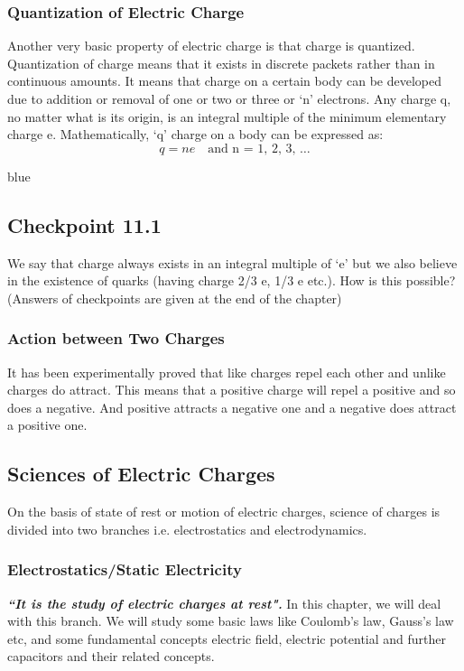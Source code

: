 \subsubsection{Quantization of Electric Charge}
Another very basic property of electric charge is that charge is quantized.
Quantization of charge means that it exists in
discrete packets rather than in continuous amounts.
It means that charge on a certain body can be developed
due to addition or removal of one or two or three or `n’ electrons.
Any charge q, no matter what is its origin,
is an integral multiple of the 
minimum elementary charge e. Mathematically,
`q' charge on a body can be expressed as:
\begin{equation*}
  q=ne \quad \textrm{and n = 1, 2, 3, …}
\end{equation*}
\begin{mybox}{blue}{}
\subsection*{\checkpoint{}  Checkpoint 11.1}
We say that charge always exists in an integral multiple of `e’ but we also believe in the existence of quarks 
(having charge 2/3 e, 1/3 e etc.). How is this possible?
(Answers of checkpoints are given at the end of the chapter)
\end{mybox}
\subsubsection{Action between Two Charges}
It has been experimentally proved that like 
charges repel each other and unlike charges do attract. This means 
that a positive charge will repel a positive and so does a negative. And positive 
attracts a negative one and a negative does attract a positive one.

\subsection*{Sciences of Electric Charges}
On the basis of state of rest or motion of electric charges, science 
of charges is divided into two branches i.e. electrostatics and 
electrodynamics.
\subsubsection{Electrostatics/Static Electricity}
\textit{\textbf{
``It is the study of electric charges at rest". }}
In this chapter, we will deal with this branch. We will 
study some basic laws like Coulomb’s law, Gauss’s law etc, and 
some fundamental concepts electric field, electric potential 
and further capacitors and their related concepts.
